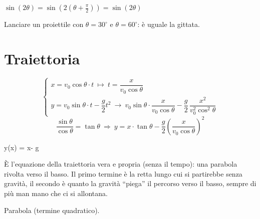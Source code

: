 \documentclass[11pt,a4paper,openany]{report}
\begin{document}
\begin{nota}
$\sin(2\theta) = \sin\!\left(2\left(\theta + \frac{\pi}{2}\right)\right) = \sin(2\theta)$
\begin{disegno}
\end{disegno}
Lanciare un proiettile con $\theta = 30^\circ$ e $\theta = 60^\circ$: è uguale la gittata.
\end{nota}

\section{Traiettoria}
\[
  \begin{cases}
    x = v_0\cos\theta\cdot t \ \longmapsto\ t = \dfrac{x}{v_0\cos\theta} \\[1.5ex]
    y = v_0\sin\theta\cdot t - \dfrac{g}{2}t^2 \ \longrightarrow\
        v_0\sin\theta\cdot\dfrac{x}{v_0\cos\theta} - \dfrac{g}{2}\,\dfrac{x^2}{v_0^2\cos^2\theta}
  \end{cases}
\]
\[
  \frac{\sin\theta}{\cos\theta} = \tan\theta
  \ \Rightarrow\
  y = x\cdot\tan\theta - \frac{g}{2}\left(\frac{x}{v_0\cos\theta}\right)^2
\]
\begin{formula}
y(x) = x\tan\theta -  g\,
\end{formula}
\begin{significato}
È l'equazione della traiettoria vera e propria (senza il tempo): una parabola rivolta verso il basso.
Il primo termine è la retta lungo cui si partirebbe senza gravità, il secondo è quanto la gravità
``piega'' il percorso verso il basso, sempre di più man mano che ci si allontana.
\end{significato}
Parabola (termine quadratico).
\end{document}
